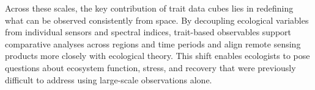 \documentclass[pdflatex,sn-mathphys-num]{sn-jnl}%
\theoremstyle{thmstyleone}%
\theoremstyle{thmstyletwo}%
\theoremstyle{thmstylethree}%
\begin{document}
Across these scales, the key contribution of trait data cubes lies in redefining what can be observed consistently from space. By decoupling ecological variables from individual sensors and spectral indices, trait-based observables support comparative analyses across regions and time periods and align remote sensing products more closely with ecological theory. This shift enables ecologists to pose questions about ecosystem function, stress, and recovery that were previously difficult to address using large-scale observations alone.








\end{document}
